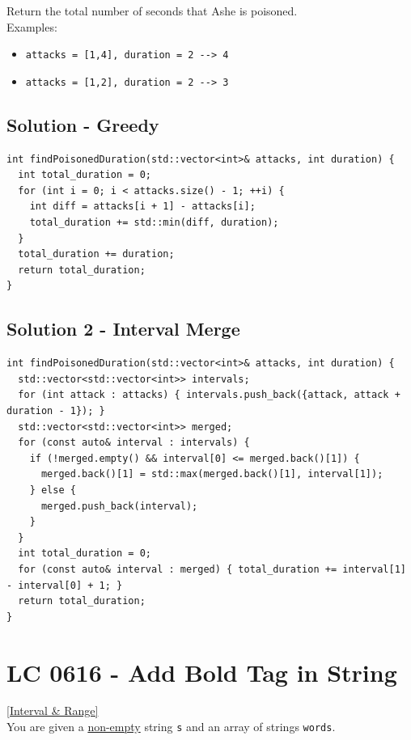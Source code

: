 Return the total number of seconds that Ashe is poisoned.\\

Examples:
\begin{itemize}
\item {\colorbox{CodeBackground}{\lstinline|attacks = [1,4], duration = 2 --> 4|}}
\item {\colorbox{CodeBackground}{\lstinline|attacks = [1,2], duration = 2 --> 3|}}
\end{itemize}

\subsection*{Solution - Greedy}
\begin{lstlisting}
int findPoisonedDuration(std::vector<int>& attacks, int duration) {
  int total_duration = 0;
  for (int i = 0; i < attacks.size() - 1; ++i) {
    int diff = attacks[i + 1] - attacks[i];
    total_duration += std::min(diff, duration);
  }
  total_duration += duration;
  return total_duration;
}
\end{lstlisting}

\subsection*{Solution 2 - Interval Merge}
\begin{lstlisting}
int findPoisonedDuration(std::vector<int>& attacks, int duration) {
  std::vector<std::vector<int>> intervals;
  for (int attack : attacks) { intervals.push_back({attack, attack + duration - 1}); }
  std::vector<std::vector<int>> merged;
  for (const auto& interval : intervals) {
    if (!merged.empty() && interval[0] <= merged.back()[1]) {
      merged.back()[1] = std::max(merged.back()[1], interval[1]);
    } else {
      merged.push_back(interval);
    }
  }
  int total_duration = 0;
  for (const auto& interval : merged) { total_duration += interval[1] - interval[0] + 1; }
  return total_duration;
}
\end{lstlisting}

\section{LC 0616 - Add Bold Tag in String}\label{lc0616}
\hyperref[sec:interval_range]{[Interval \& Range]}\\

You are given a \ul{non-empty} string {\colorbox{CodeBackground}{\lstinline|s|}} and an array of strings {\colorbox{CodeBackground}{\lstinline|words|}}.\\

